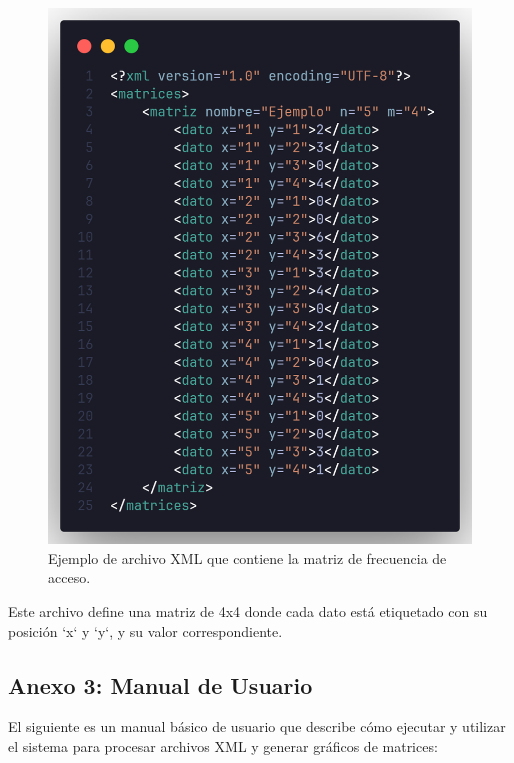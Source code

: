\documentclass[letterpaper,12pt]{article}
\begin{document}
\begin{multicols}{2}
    \begin{figure}[H]
        \centering
        \includegraphics[width=\columnwidth]{images/xml_structure.png}
        \caption{Ejemplo de archivo XML que contiene la matriz de frecuencia de acceso.}
    \end{figure}

    Este archivo define una matriz de 4x4 donde cada dato está etiquetado con su posición `x` y `y`, y su valor correspondiente.


    \subsection*{Anexo 3: Manual de Usuario}
    El siguiente es un manual básico de usuario que describe cómo ejecutar y utilizar el sistema para procesar archivos XML y generar gráficos de matrices:


\end{multicols}
\end{document}
